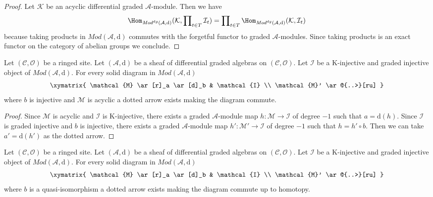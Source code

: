 \begin{proof}
Let $\mathcal{K}$ be an acyclic differential graded $\mathcal{A}$-module.
Then we have
$$
\Hom_{\textit{Mod}^{dg}(\mathcal{A}, \text{d})}(\mathcal{K},
\prod\nolimits_{t \in T} \mathcal{I}_t)
=
\prod\nolimits_{t \in T}
\Hom_{\textit{Mod}^{dg}(\mathcal{A}, \text{d})}(\mathcal{K}, \mathcal{I}_t)
$$
because taking products in $\textit{Mod}(\mathcal{A}, \text{d})$
commutes with the forgetful functor to graded $\mathcal{A}$-modules.
Since taking products is an exact functor on the category of abelian groups
we conclude.
\end{proof}

\begin{lemma}
\label{lemma-first-property-dg-injective}
Let $(\mathcal{C}, \mathcal{O})$ be a ringed site.
Let $(\mathcal{A}, \text{d})$
be a sheaf of differential graded algebras on $(\mathcal{C}, \mathcal{O})$.
Let $\mathcal{I}$ be a K-injective and graded injective
object of $\textit{Mod}(\mathcal{A}, \text{d})$.
For every solid diagram in $\textit{Mod}(\mathcal{A}, \text{d})$
$$
\xymatrix{
\mathcal{M} \ar[r]_a \ar[d]_b & \mathcal{I} \\
\mathcal{M}' \ar@{..>}[ru]
}
$$
where $b$ is injective and $\mathcal{M}$ is acyclic
a dotted arrow exists making the diagram commute.
\end{lemma}

\begin{proof}
Since $\mathcal{M}$ is acyclic and $\mathcal{I}$ is K-injective,
there exists a graded $\mathcal{A}$-module map
$h : \mathcal{M} \to \mathcal{I}$ of degree $-1$
such that $a = \text{d}(h)$. Since $\mathcal{I}$ is graded injective
and $b$ is injective, there exists a graded $\mathcal{A}$-module
map $h' : \mathcal{M}' \to \mathcal{I}$ of degree $-1$
such that $h = h' \circ b$. Then we can take $a' = \text{d}(h')$
as the dotted arrow.
\end{proof}

\begin{lemma}
\label{lemma-second-property-dg-injective}
Let $(\mathcal{C}, \mathcal{O})$ be a ringed site. Let
$(\mathcal{A}, \text{d})$ be a sheaf of differential graded algebras on
$(\mathcal{C}, \mathcal{O})$. Let $\mathcal{I}$ be a
K-injective and graded injective
object of $\textit{Mod}(\mathcal{A}, \text{d})$.
For every solid diagram in $\textit{Mod}(\mathcal{A}, \text{d})$
$$
\xymatrix{
\mathcal{M} \ar[r]_a \ar[d]_b & \mathcal{I} \\
\mathcal{M}' \ar@{..>}[ru]
}
$$
where $b$ is a quasi-isomorphism a dotted arrow exists making the
diagram commute up to homotopy.
\end{lemma}

